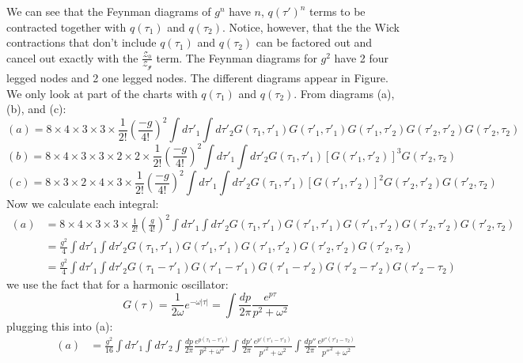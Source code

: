 \documentclass{article}
\begin{document}
We can see that the Feynman diagrams of $g^n$ have $n$, $q(\tau')^n$ terms to be contracted together with $q(\tau_1)$  and $q(\tau_2)$.  Notice, however, that the the Wick contractions that don't include $q(\tau_1)$ and $q(\tau_2)$ can be factored out and cancel out exactly with the $\frac{\mathcal{Z}_0}{\mathcal{Z_g}}$ term. The Feynman diagrams for $g^2$ have 2 four legged nodes and 2 one legged nodes. The different diagrams appear in Figure. We only look at part of the charts with  $q(\tau_1)$ and $q(\tau_2)$. From diagrams (a), (b), and (c):
\begin{equation*}
    (a)=8\times 4\times 3 \times 3 \times \frac{1}{2!}(\frac{-g}{4!})^2\int d\tau'_1\int d\tau'_2 G(\tau_1,\tau'_1)G(\tau'_1,\tau'_1)G(\tau'_1,\tau'_2)G(\tau'_2,\tau'_2)G(\tau'_2,\tau_2)
\end{equation*}
\begin{equation*}
   (b)=8\times 4 \times 3\times 3\times 2 \times 2 \times \frac{1}{2!}(\frac{-g}{4!})^2\int d\tau'_1\int d\tau'_2 G(\tau_1,\tau'_1)[G(\tau'_1,\tau'_2)]^3G(\tau'_2,\tau_2)
\end{equation*}
\begin{equation*}
   (c)=8\times 3 \times 2\times 4\times 3 \times \frac{1}{2!}(\frac{-g}{4!})^2\int d\tau'_1\int d\tau'_2 G(\tau_1,\tau'_1)[G(\tau'_1,\tau'_2)]^2G(\tau'_2,\tau'_2)G(\tau'_2,\tau_2)
\end{equation*}
Now we calculate each integral:
\begin{equation*}
\begin{split}
    (a) &=8\times 4\times 3 \times 3 \times \frac{1}{2!}(\frac{g}{4!})^2\int d\tau'_1\int d\tau'_2 G(\tau_1,\tau'_1)G(\tau'_1,\tau'_1)G(\tau'_1,\tau'_2)G(\tau'_2,\tau'_2)G(\tau'_2,\tau_2)\\
    &=  \frac{g^2}{4}\int d\tau'_1\int d\tau'_2 G(\tau_1,\tau'_1)G(\tau'_1,\tau'_1)G(\tau'_1,\tau'_2)G(\tau'_2,\tau'_2)G(\tau'_2,\tau_2)\\
    &=  \frac{g^2}{4}\int d\tau'_1\int d\tau'_2 G(\tau_1 -\tau'_1)G(\tau'_1-\tau'_1)G(\tau'_1-\tau'_2)G(\tau'_2-\tau'_2)G(\tau'_2-\tau_2)
\end{split}
\end{equation*}
we use the fact that for a harmonic oscillator:
\begin{equation} \label{eq:propogator int}
    G(\tau)=\frac{1}{2\omega}e^{-\omega|\tau|}=\int \frac{dp}{2\pi}\frac{e^{p\tau}}{p^2+\omega^2}
\end{equation}
plugging this into (a):
\begin{equation*}
\begin{split}
    (a) &=  \frac{g^2}{16}\int d\tau'_1\int d\tau'_2 \int \frac{dp}{2\pi}\frac{e^{p(\tau_1-\tau'_1)}}{p^2+\omega^2}\int \frac{dp'}{2\pi}\frac{e^{p'(\tau'_1-\tau'_2)}}{p'^2+\omega^2}\int \frac{dp''}{2\pi}\frac{e^{p''(\tau'_2-\tau_2)}}{p''^2+\omega^2}
\end{split}
\end{equation*}
\end{document}
